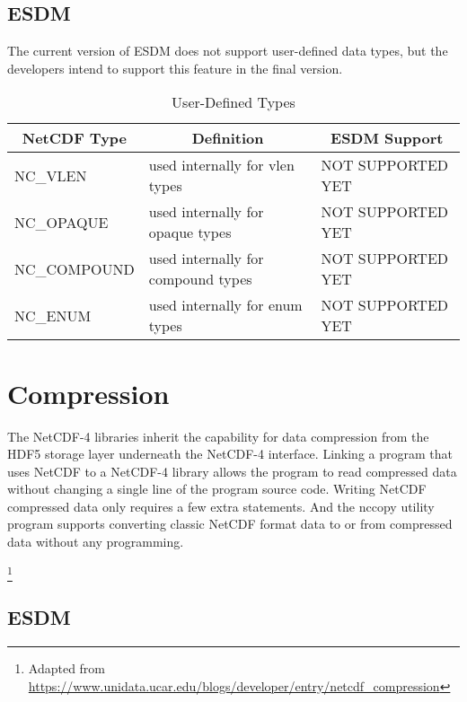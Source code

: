 \subsection{ESDM}

The current version of ESDM does not support user-defined data types, but the developers intend to support this feature in the final version.

\begin{table}[H]
\centering
\begin{tabular}{|l|m{6cm}|l|}
\hline
\multicolumn{1}{|c|}{NetCDF Type} & \multicolumn{1}{c|}{Definition} & \multicolumn{1}{c|}{ESDM Support} \\ \hline \hline
\scriptsize{NC\_VLEN} & used internally for vlen types &      \scriptsize{NOT SUPPORTED YET}       \\ \hline
\scriptsize{NC\_OPAQUE} & used internally for opaque types &     \scriptsize{NOT SUPPORTED YET}        \\ \hline
\scriptsize{NC\_COMPOUND} & used internally for compound types &    \scriptsize{NOT SUPPORTED YET}         \\ \hline
\scriptsize{NC\_ENUM} & used internally for enum types &       \scriptsize{NOT SUPPORTED YET}      \\ \hline \hline
\end{tabular}
\caption{\label{ud-datatypes} User-Defined Types}
\end{table}

\section{Compression}

{\itshape

The NetCDF-4 libraries inherit the capability for data compression from the HDF5 storage layer underneath the NetCDF-4 interface. Linking a program that uses NetCDF to a NetCDF-4 library allows the program to read compressed data without changing a single line of the program source code. Writing NetCDF compressed data only requires a few extra statements. And the nccopy utility program supports converting classic NetCDF format data to or from compressed data without any programming.
}\footnote{Adapted from \url{https://www.unidata.ucar.edu/blogs/developer/entry/netcdf_compression}}

\subsection{ESDM}

